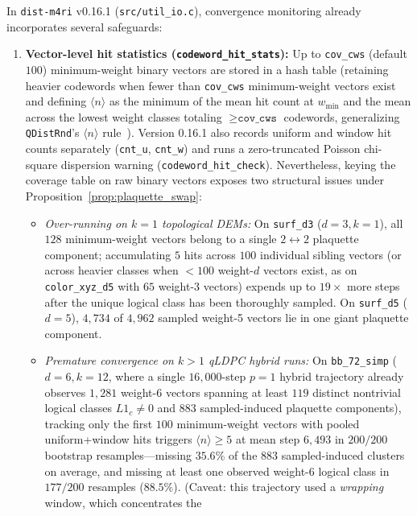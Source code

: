\documentclass[12pt]{article}
\theoremstyle{definition}
\newcommand{\ttt}[1]{\texttt{#1}}
\begin{document}
In \ttt{dist-m4ri} v0.16.1 (\ttt{src/util\_io.c}), convergence monitoring already incorporates several safeguards:
\begin{enumerate}[label=(\arabic*)]
  \item \textbf{Vector-level hit statistics (\ttt{codeword\_hit\_stats}):} Up to \ttt{cov\_cws} (default $100$)
    minimum-weight binary vectors are stored in a hash table (retaining heavier codewords when fewer than
    \ttt{cov\_cws} minimum-weight vectors exist and defining $\langle n \rangle$ as the minimum of the mean hit
    count at $w_{\min}$ and the mean across the lowest weight classes totaling $\ge \ttt{cov\_cws}$ codewords,
    generalizing \ttt{QDistRnd}'s $\langle n \rangle$ rule~\cite{PryadkoShabashovKozin2022QDistRnd}). Version
    0.16.1 also records uniform and window hit counts separately (\ttt{cnt\_u}, \ttt{cnt\_w}) and runs a
    zero-truncated Poisson chi-square dispersion warning (\ttt{codeword\_hit\_check}). Nevertheless, keying the
    coverage table on raw binary vectors exposes two structural issues under Proposition~\ref{prop:plaquette_swap}:
    \begin{itemize}
      \item \emph{Over-running on $k = 1$ topological DEMs:} On \ttt{surf\_d3} ($d = 3, k = 1$), all $128$
        minimum-weight vectors belong to a single $2 \leftrightarrow 2$ plaquette component; accumulating $5$ hits
        across $100$ individual sibling vectors (or across heavier classes when $< 100$ weight-$d$ vectors exist, as
        on \ttt{color\_xyz\_d5} with $65$ weight-3 vectors) expends up to $19\times$ more steps after the unique
        logical class has been thoroughly sampled. On \ttt{surf\_d5} ($d = 5$), $4{,}734$ of $4{,}962$ sampled
        weight-5 vectors lie in one giant plaquette component.
      \item \emph{Premature convergence on $k > 1$ qLDPC hybrid runs:} On \ttt{bb\_72\_simp} ($d = 6, k = 12$, where
        a single $16{,}000$-step $p = 1$ hybrid trajectory already observes $1{,}281$ weight-6 vectors spanning at
        least $119$ distinct nontrivial logical classes $L 1_c \neq 0$ and $883$ sampled-induced plaquette
        components), tracking only the first $100$ minimum-weight vectors with pooled uniform+window hits triggers
        $\langle n \rangle \ge 5$ at mean step $6{,}493$ in $200/200$ bootstrap resamples---missing $35.6\%$ of the
        $883$ sampled-induced clusters on average, and missing at least one observed weight-6 logical class in
        $177/200$ resamples ($88.5\%$). (Caveat: this trajectory used a \emph{wrapping} window, which concentrates the

\end{itemize}
\end{enumerate}
\end{document}
